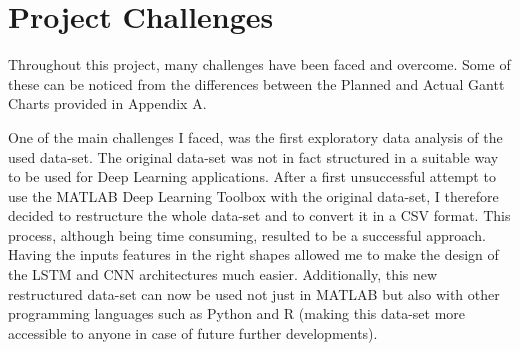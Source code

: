 \section{Project Challenges}
Throughout this project, many challenges have been faced and overcome. Some of these can be noticed from the differences between the Planned and Actual Gantt Charts provided in Appendix A. 

One of the main challenges I faced, was the first exploratory data analysis of the used data-set. The original data-set was not in fact structured in a suitable way to be used for Deep Learning applications. After a first unsuccessful attempt to use the MATLAB Deep Learning Toolbox with the original data-set, I therefore decided to restructure the whole data-set and to convert it in a CSV format. This process, although being time consuming, resulted to be a successful approach. Having the inputs features in the right shapes allowed me to make the design of the LSTM and CNN architectures much easier. Additionally, this new restructured data-set can now be used not just in MATLAB but also with other programming languages such as Python and R (making this data-set more accessible to anyone in case of future further developments).